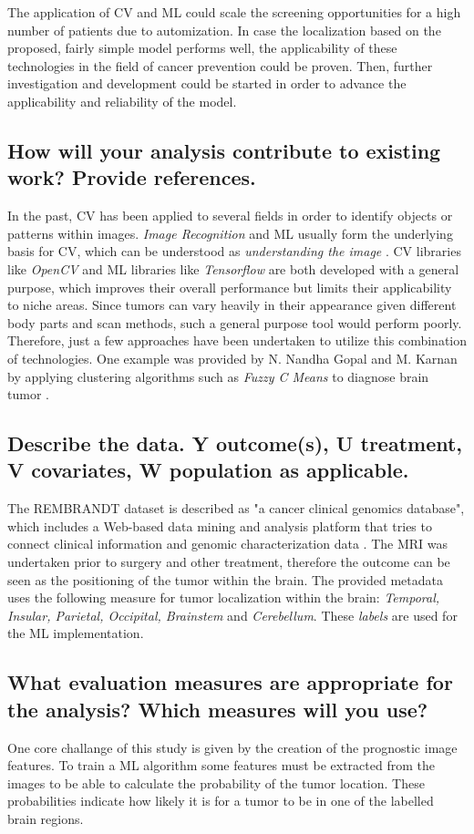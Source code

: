\documentclass[twoside,11pt]{article}
\begin{document}
The application of CV and ML could scale the screening opportunities for a high number of patients due to automization. In case the localization based on the proposed, fairly simple model performs well, the applicability of these technologies in the field of cancer prevention could be proven. Then, further investigation and development could be started in order to advance the applicability and reliability of the model.

\subsection{How will your analysis contribute to existing work? Provide references.}

In the past, CV has been applied to several fields in order to identify objects or patterns within images. \textit{Image Recognition} and ML usually form the underlying basis for CV, which can be understood as  \textit{understanding the image} . CV libraries like \textit{OpenCV} and ML libraries like \textit{Tensorflow} are both developed with a general purpose, which improves their overall performance but limits their applicability to niche areas. Since tumors can vary heavily in their appearance given different body parts and scan methods, such a general purpose tool would perform poorly. Therefore,  just a few approaches have been undertaken to utilize this combination of technologies. One example was provided by N. Nandha Gopal and M. Karnan by applying clustering algorithms such as \textit{Fuzzy C Means} to diagnose brain tumor \citep{cite2}.

\subsection{Describe the data. Y outcome(s), U treatment, V covariates, W population as applicable.}
The REMBRANDT dataset is described as "a cancer clinical genomics database", which includes a Web-based data mining and analysis platform that tries to connect clinical information and genomic characterization data \citep{cite3}. The MRI was undertaken prior to surgery and other treatment, therefore the outcome can be seen as the positioning of the tumor within the brain. The provided metadata uses the following measure for tumor localization within the brain: \textit{Temporal, Insular, Parietal, Occipital, Brainstem} and \textit{Cerebellum}. These \textit{labels} are used for the ML implementation.

\subsection{What evaluation measures are appropriate for the analysis? Which measures will you use?}
One core challange of this study is given by the creation of the prognostic image features. To train a ML algorithm some features must be extracted from the images to be able to calculate the probability of the tumor location. These probabilities indicate how likely it is for a tumor to be in one of the labelled brain regions.
\end{document}
